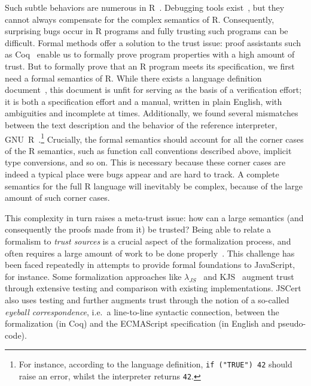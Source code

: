 \documentclass[
    sigplan,
    10pt,
    review, %
    natbib=false %
 ]{acmart}
\begin{document}
Such subtle behaviors are numerous in R~\parencite{RInferno}.
Debugging tools exist~\parencite{mcpherson2014},
but they cannot always compensate for the complex semantics of R.
Consequently, surprising bugs occur in R programs
and fully trusting such programs can be difficult.
%
Formal methods offer a solution to the trust issue:
proof assistants such as Coq~\parencite{Coq} enable us
to formally prove program properties with a high amount of trust.
But to formally prove that an R program meets its specification,
we first need a formal semantics of R.
While there exists a language definition document~\parencite{team2000r}, this document is unfit for serving as the basis of a verification effort; it is both a specification effort and a manual, written in plain English, with ambiguities and incomplete at times. Additionally, we found several mismatches between the text description and the behavior of the reference interpreter, GNU~R~\parencite{Rwebsite}.\footnote{For instance, according to the language definition, \texttt{if ("TRUE") 42} should raise an error, whilst the interpreter returns \texttt{42}.}
Crucially, the formal semantics should account for all the corner cases of the R semantics, such as function call conventions described above, implicit type conversions, and so on.
This is necessary because these corner cases are indeed a typical place were bugs appear and are hard to track.
A complete semantics for the full R language will inevitably be complex,
because of the large amount of such corner cases.

This complexity in turn raises a meta-trust issue:
how can a large semantics (and consequently the proofs made from it)
be trusted? Being able to relate a formalism to {\em trust sources} is a crucial aspect of the formalization process, and often requires a large amount of work to be done properly~\parencite{leroy2014pip}. This challenge has been faced repeatedly in attempts to provide formal foundations to JavaScript, for instance.
%
Some formalization approaches like $\lambda_{JS}$~\cite{Guha2010} and KJS~\cite{kjs} augment trust through extensive testing and comparison with existing implementations. JSCert~\parencite{popl14jscert} also uses testing and further augments trust through the notion of a so-called {\em eyeball correspondence}, i.e.~a line-to-line syntactic connection, between the formalization (in Coq) and the ECMAScript specification (in English and pseudo-code).
\end{document}
